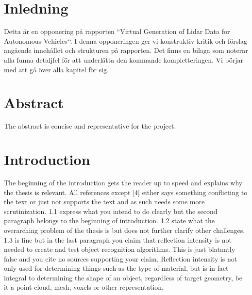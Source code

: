 \documentclass[12pt,a4paper,twoside,openright]{report}
\begin{document}
 


\newcommand{\varHeadline}{Opponering av DATX02-17-10}
\newcommand{\varSubtitle}{Av DATX02-17-12}
\newcommand{\varDepartment}{Department of Computer Science and Engineering}
\newcommand{\varNames}{André Perzon, Björn Strömberg, Chi Thong Luong,  \\
Elias Forsberg, Jesper Åberg, Jon Johnsson}




\section*{Inledning}

	Detta är en opponering på rapporten ``Virtual Generation of Lidar Data for
	Autonomous Vehicles‘‘. I denna opponeringen ger vi konstruktiv kritik och
	förslag angående innehållet och strukturen på rapporten. Det finns en
	bilaga som noterar alla funna detaljfel för att underlätta den kommande
	kompletteringen. Vi börjar med att gå över alla kapitel för sig. 

\section*{Abstract}

	The abstract is concise and representative for the project.

\section*{Introduction}

	The beginning of the introduction gets the reader up to speed and explains
	why the thesis is relevant. All references except [4] either says something
	conflicting to the text or just not supports the text and as such needs
	some more scrutinization. 1.1 express what you intend to do clearly but the
	second paragraph belongs to the beginning of introduction. 1.2 state what
	the overarching problem of the thesis is but does not further clarify other
	challenges. 1.3 is fine but in the last paragraph you claim that reflection 
	intensity is not needed	to create and test object recognition algorithms. 
	This is just blatantly false and you cite no sources supporting your claim. 
	Reflection intensity is not only used for determining things such as the 
	type of material, but is in fact integral to determining the shape of an 
	object, regardless of target geometry, be it a point cloud, mesh, voxels 
	or other representation.
\end{document}
